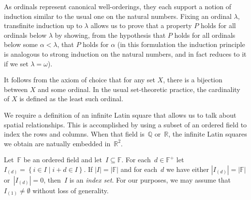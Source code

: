 \documentclass[12pt,a4paper]{article}
\newcommand{\R}{\mathbb{R}}
\newcommand{\Q}{\mathbb{Q}}
\newcommand{\F}{\mathbb{F}}
\newcommand{\st}{\; | \;}
\newcommand{\set}[2]{\left\{#1\st #2 \right\}}
\begin{document}
As ordinals represent canonical well-orderings, they each support a notion of induction similar to the usual one on the natural numbers. Fixing an ordinal $\lambda$, transfinite induction up to $\lambda$ allows us to prove that a property $P$ holds for all ordinals below $\lambda$ by showing, from the hypothesis that $P$ holds for all ordinals below some $\alpha<\lambda$, that $P$ holds for $\alpha$ (in this formulation
the induction principle is analogous to strong induction on the natural numbers, and in fact reduces to it if we set $\lambda=\omega$).

It follows from the axiom of choice that for any set $X$, there is a bijection between $X$ and some ordinal. In the usual set-theoretic practice, the cardinality of $X$ is defined as the least such ordinal. 


We require a definition of an infinite Latin square that allows us to talk about spatial relationships.  This is accomplished by using a subset of an ordered field to index the rows and columns.  When that field is~$\Q$ or~$\R$, the infinite Latin squares we obtain are natually embedded in~$\R^2$.

Let~$\F$ be an ordered field and let~$I \subseteq \F$.   For each~$d \in \F^+$ let~$I_{(d)} = \set{ i \in I }{  i+d \in I }$.  If $|I| = |\F|$ and for each~$d$ we have either $|I_{(d)}| = |\F|$ or~$|I_{(d)}| = 0$, then~$I$ is an {\em index set}.   For our purposes, we may assume that~$I_{(1)} \neq \emptyset$ without loss of generality.
\end{document}
